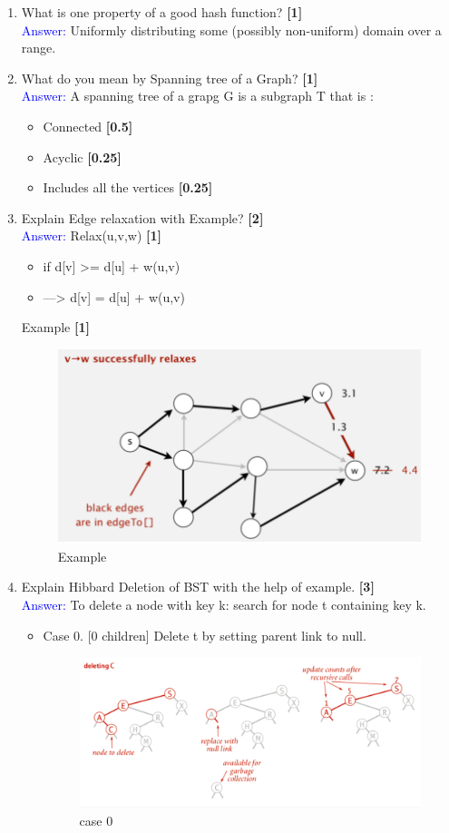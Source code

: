 \documentclass[12pt ,a4paper]{exam}
\begin{document}
\begin{enumerate}[start=1,label={\bfseries Q\arabic*)}]
		\item What is one property of a good hash function?  \hfill \textbf{[1]}\\
		\textcolor{blue}{Answer: } Uniformly distributing some (possibly non-uniform) domain over a range.
		\item What do you mean by Spanning tree of a Graph? \hfill \textbf{[1]}\\
		\textcolor{blue}{Answer: } A spanning tree of a grapg G is a subgraph T that is :
			\begin{itemize}
				\item Connected \hfill \textbf{[0.5]}
				\item Acyclic \hfill \textbf{[0.25]}
				\item Includes all the vertices \hfill \textbf{[0.25]}
			\end{itemize}
		\item Explain Edge relaxation with Example? \hfill \textbf{[2]}\\
		\textcolor{blue}{Answer: }  Relax(u,v,w) \hfill \textbf{[1]}
		\begin{itemize}
			\item if d[v] >= d[u] + w(u,v) 
			\item —> d[v] = d[u] + w(u,v)
		\end{itemize}
	    Example \hfill \textbf{[1]}
		\begin{figure}  [h]
			\centering
			\includegraphics[width=0.5\linewidth]{"Screenshot 2020-12-25 at 3.11.25 PM"}
			\caption{Example}
			\label{fig:screenshot-2020-12-25-at-3}
		\end{figure}
	   \pagebreak
		 \item Explain Hibbard Deletion of BST with the help of example. \hfill \textbf{[3]}\\
		 \textcolor{blue}{Answer: } To delete a node with key k: search for node t containing key k.
		 \begin{itemize}
		 	\item  Case 0. [0 children] Delete t by setting parent link to null.
		 	\begin{figure} [h]
		 		\centering
		 		\includegraphics[width=0.7\linewidth]{"Screenshot 2020-12-26 at 8.38.56 AM"}
		 		\caption{case 0}
		 		\label{fig:screenshot-2020-12-26-at-8}
		 	\end{figure}
		 	

\end{itemize}
\end{enumerate}
\end{document}
